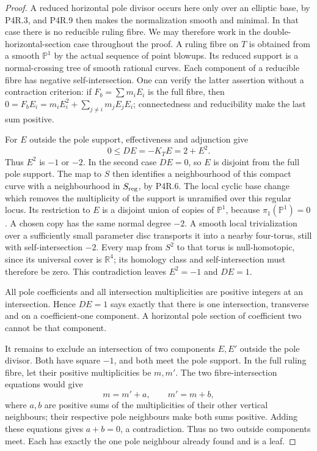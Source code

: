 \begin{proof}
A reduced horizontal pole divisor occurs here only over an
elliptic base, by P4R.3, and P4R.9 then makes the normalization
smooth and minimal. In that case there is no reducible ruling
fibre. We may therefore work in the double-horizontal-section
case throughout the proof.
A ruling fibre on $T$ is obtained from a smooth $\mathbb P^1$
by the actual sequence of point blowups. Its reduced support is
a normal-crossing tree of smooth rational curves. Each component
of a reducible fibre has negative self-intersection. One can
verify the latter assertion without a contraction criterion:
if $F_b=\sum m_iE_i$ is the full fibre, then
$0=F_bE_i=m_iE_i^2+\sum_{j\ne i}m_jE_jE_i$;
connectedness and reducibility make the last sum positive.

For $E$ outside the pole support, effectiveness and adjunction give
\[
 0\le DE=-K_TE=2+E^2.
\]
Thus $E^2$ is $-1$ or $-2$. In the second case $DE=0$,
so $E$ is disjoint from the full pole support. The map to $S$
then identifies a neighbourhood of this compact curve with a
neighbourhood in $S_{\rm reg}$, by P4R.6. The local cyclic
base change which removes the multiplicity of the support is
unramified over this regular locus. Its restriction to $E$ is
a disjoint union of copies of $\mathbb P^1$, because
$\pi_1(\mathbb P^1)=0$. A chosen copy has the same normal
degree $-2$. A smooth local trivialization over a sufficiently
small parameter disc transports it into a nearby four-torus,
still with self-intersection $-2$. Every map from $S^2$ to that
torus is null-homotopic, since its universal cover is
$\mathbb R^4$; its homology class and self-intersection must
therefore be zero. This contradiction leaves $E^2=-1$ and
$DE=1$.

All pole coefficients and all intersection multiplicities are
positive integers at an intersection. Hence $DE=1$ says exactly
that there is one intersection, transverse and on a coefficient-one
component. A horizontal pole section of coefficient two cannot
be that component.

It remains to exclude an intersection of two components $E,E'$
outside the pole divisor. Both have square $-1$, and both meet
the pole support. In the full ruling fibre, let their positive
multiplicities be $m,m'$. The two fibre-intersection equations
would give
\[
 m=m'+a,\qquad m'=m+b,
\]
where $a,b$ are positive sums of the multiplicities of their
other vertical neighbours; their respective pole neighbours make both
sums positive. Adding these equations gives $a+b=0$, a
contradiction. Thus no two outside components meet. Each has
exactly the one pole neighbour already found and is a leaf.
\end{proof}














